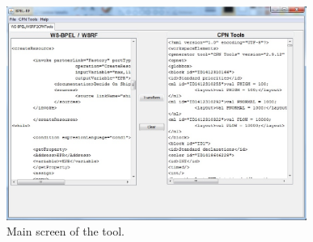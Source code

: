\begin{center}
\begin{figure}[!h]
\includegraphics[width=\columnwidth,height=7cm]{Figures/mainscreen.eps}
\caption{Main screen of the tool.}
\label{main}
\end{figure}
\end{center}
\vspace{-2cm}
